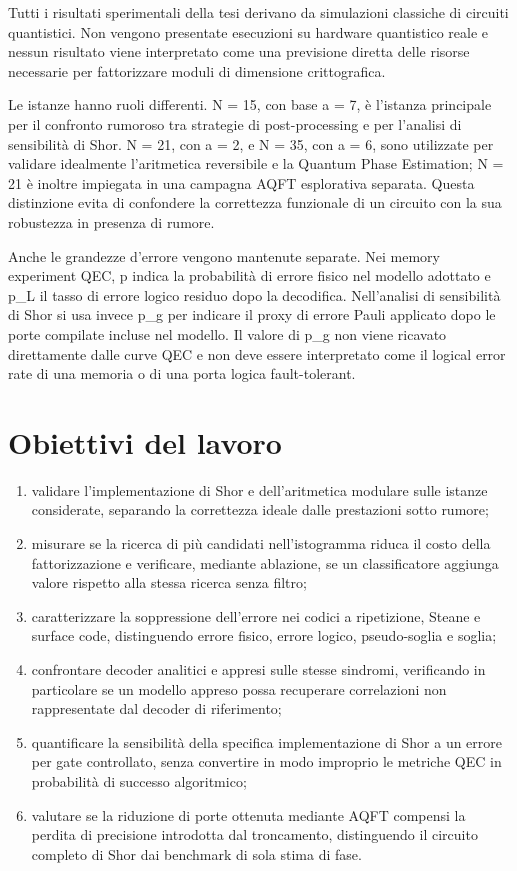 Tutti i risultati sperimentali della tesi derivano da simulazioni classiche di circuiti quantistici. Non vengono presentate esecuzioni su hardware quantistico reale e nessun risultato viene interpretato come una previsione diretta delle risorse necessarie per fattorizzare moduli di dimensione crittografica. \cite{preskill2018,gidney2021,aharonov1997fault}

Le istanze hanno ruoli differenti. N = 15, con base a = 7, è l'istanza principale per il confronto rumoroso tra strategie di post-processing e per l'analisi di sensibilità di Shor. N = 21, con a = 2, e N = 35, con a = 6, sono utilizzate per validare idealmente l'aritmetica reversibile e la Quantum Phase Estimation; N = 21 è inoltre impiegata in una campagna AQFT esplorativa separata. Questa distinzione evita di confondere la correttezza funzionale di un circuito con la sua robustezza in presenza di rumore.

Anche le grandezze d'errore vengono mantenute separate. Nei memory experiment QEC, p indica la probabilità di errore fisico nel modello adottato e p\_L il tasso di errore logico residuo dopo la decodifica. Nell'analisi di sensibilità di Shor si usa invece p\_g per indicare il proxy di errore Pauli applicato dopo le porte compilate incluse nel modello. Il valore di p\_g non viene ricavato direttamente dalle curve QEC e non deve essere interpretato come il logical error rate di una memoria o di una porta logica fault-tolerant.

\section{Obiettivi del lavoro}\label{sec:finale_2_3}

\begin{enumerate}
\def\labelenumi{\arabic{enumi}.}
\item
  validare l'implementazione di Shor e dell'aritmetica modulare sulle istanze considerate, separando la correttezza ideale dalle prestazioni sotto rumore;
\item
  misurare se la ricerca di più candidati nell'istogramma riduca il costo della fattorizzazione e verificare, mediante ablazione, se un classificatore aggiunga valore rispetto alla stessa ricerca senza filtro;
\item
  caratterizzare la soppressione dell'errore nei codici a ripetizione, Steane e surface code, distinguendo errore fisico, errore logico, pseudo-soglia e soglia;
\item
  confrontare decoder analitici e appresi sulle stesse sindromi, verificando in particolare se un modello appreso possa recuperare correlazioni non rappresentate dal decoder di riferimento;
\item
  quantificare la sensibilità della specifica implementazione di Shor a un errore per gate controllato, senza convertire in modo improprio le metriche QEC in probabilità di successo algoritmico;
\item
  valutare se la riduzione di porte ottenuta mediante AQFT compensi la perdita di precisione introdotta dal troncamento, distinguendo il circuito completo di Shor dai benchmark di sola stima di fase.
\end{enumerate}

